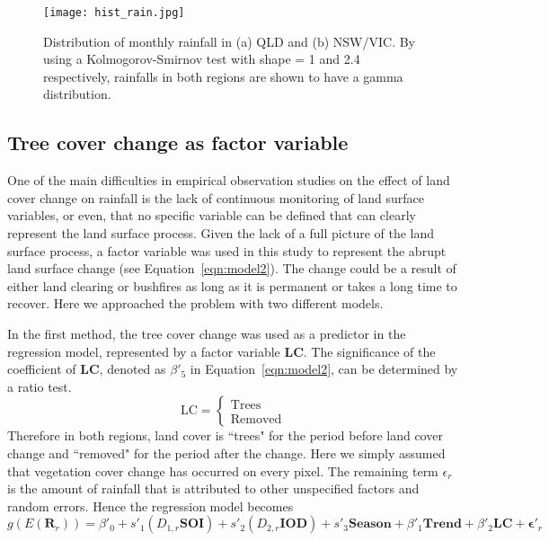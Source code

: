 \documentclass[draft,linenumbers]{agujournal}
\begin{document}
\begin{article}
\begin{figure}[htp]
  \centering
  \texttt{[image: hist\_rain.jpg]}
  \caption{Distribution of monthly rainfall in (a) QLD and (b) NSW/VIC. By using a Kolmogorov-Smirnov test with shape = 1 and 2.4 respectively, rainfalls in both regions are shown to have a gamma distribution.}
  \label{fig:hist_rain}
\end{figure}

\subsection{Tree cover change as factor variable}

One of the main difficulties in empirical observation studies on the effect of land cover change on rainfall is the lack of continuous monitoring of land surface variables, or even, that no specific variable can be defined that can clearly represent the land surface process. Given the lack of a full picture of the land surface process, a factor variable was used in this study to represent the abrupt land surface change (see Equation~\ref{eqn:model2}). The change could be a result of either land clearing or bushfires as long as it is permanent or takes a long time to recover. Here we approached the problem with two different models.

In the first method, the tree cover change was used as a predictor in the regression model, represented by a factor variable \textbf{LC}. The significance of the coefficient of \textbf{LC}, denoted as $\beta'_5$ in Equation~\ref{eqn:model2}, can be determined by a ratio test. 
\begin{equation}
  \mbox{LC} = \left\{ \begin{array}{ll}
     \mbox{Trees} \\
     \mbox{Removed}
  \end{array} \right.
  \label{eqn:dummyC}
\end{equation}
Therefore in both regions, land cover is ``trees" for the period before land cover change and ``removed" for the period after the change. Here we simply assumed that vegetation cover change has occurred on every pixel. The remaining term $\epsilon_r$ is the amount of rainfall that is attributed to other unspecified factors and random errors. Hence the regression model becomes
\vspace{0.5cm}
\begin{equation}
g(E(\mathbf{R}_r)) = \beta'_0 + s'_1(D_{1,r}\mathbf{SOI}) + s'_2(D_{2,r}\mathbf{IOD}) + s'_3\mathbf{Season} + \beta'_1\mathbf{Trend} + \beta'_2\mathbf{LC} + \boldsymbol{\epsilon'}_r
  \label{eqn:model2}
\end{equation}


\end{article}
\end{document}
